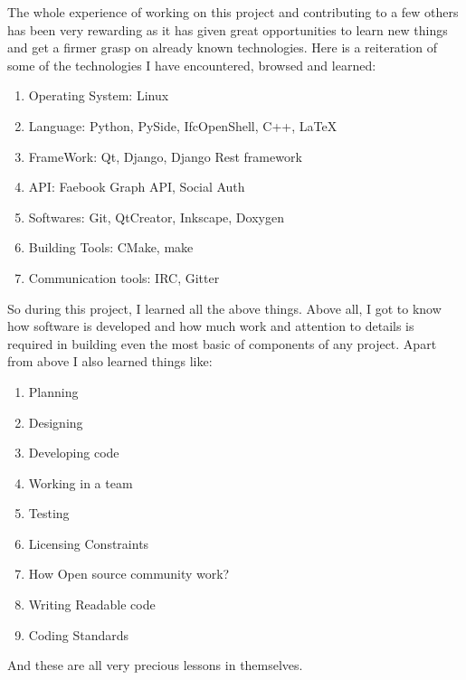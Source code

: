 The whole experience of working on this project and contributing to a few others has been very
rewarding as it has given great opportunities to learn new things and get a firmer grasp on already
known technologies. Here is a reiteration of some of the technologies I have encountered, browsed and learned:
\begin{enumerate}
    \item Operating System: Linux
    \item Language: Python, PySide, IfcOpenShell, C++, \LaTeX
    \item FrameWork: Qt, Django, Django Rest framework
    \item API: Faebook Graph API, Social Auth
    \item Softwares: Git, QtCreator, Inkscape, Doxygen
    \item Building Tools: CMake, make
    \item Communication tools: IRC, Gitter
\end{enumerate}
So during this project, I learned all the above things. Above all, I got to know how software is
developed and how much work and attention to details is required in building even the most basic
of components of any project. Apart from above I also learned things like:
\begin{enumerate}
    \item Planning
    \item Designing
    \item Developing code
    \item Working in a team
    \item Testing
    \item Licensing Constraints
    \item How Open source community work?
    \item Writing Readable code
    \item Coding Standards
\end{enumerate}
And these are all very precious lessons in themselves.
